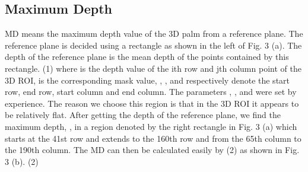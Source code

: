 \subsection{Maximum Depth}
\label{ssec:methodology:md}

MD means the maximum depth value of the 3D palm from a reference plane. The reference plane is decided using a rectangle as shown in the left of Fig. 3 (a). The depth of the reference plane   is the mean depth of the points contained by this rectangle.
                            (1)
where   is the depth value of the ith row and jth column point of the 3D ROI,   is the corresponding mask value,  ,  ,   and   respectively denote the start row, end row, start column and end column. The parameters ,  ,   and   were set by experience. The reason we choose this region is that in the 3D ROI it appears to be relatively flat.
After getting the depth of the reference plane, we find the maximum depth,  , in a region denoted by the right rectangle in Fig. 3 (a) which starts at the 41st row and extends to the 160th row and from the 65th column to the 190th column. The MD can then be calculated easily by (2) as shown in Fig. 3 (b).
                                      (2)
